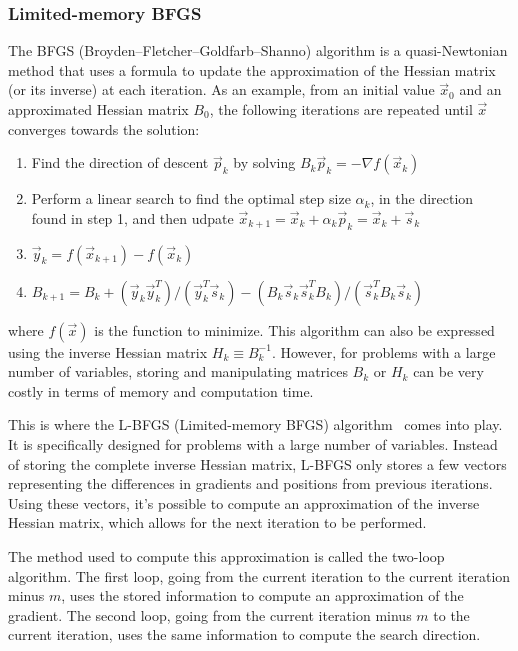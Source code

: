 \subsubsection{Limited-memory BFGS}
The BFGS (Broyden–Fletcher–Goldfarb–Shanno) algorithm is a quasi-Newtonian method that uses a formula to update the approximation of the  Hessian matrix (or its inverse) at each iteration. As an example, from an initial value $\Vec{x}_0$ and an approximated Hessian matrix $B_0$, the following iterations are repeated until $\Vec{x}$ converges towards the solution:
\begin{enumerate}
    \item Find the direction of descent $\Vec{p}_k$ by solving $B_k\Vec{p}_k = - \nabla f(\Vec{x}_k)$
    \item Perform a linear search to find the optimal step size $\alpha_k$, in the direction found in step 1, and then udpate
        $\Vec{x}_{k+1} = \Vec{x}_k + \alpha_k \Vec{p}_k = \Vec{x}_k + \Vec{s}_k$
    \item $\Vec{y}_k = f(\Vec{x}_{k+1}) - f(\Vec{x}_k)$
    \item $B_{k+1} = B_k + \left(\Vec{y}_k \Vec{y}_k^T\right)/\left(\Vec{y}_k^T \Vec{s}_k \right) - \left( B_k \Vec{s}_k\Vec{s}_k^TB_k\right)/\left(\Vec{s}_k^T B_k \Vec{s}_k\right)$
\end{enumerate} where $f(\Vec{x})$ is the function to minimize. This algorithm can also be expressed using the inverse Hessian matrix $H_k \equiv B_k^{-1}$. However, for problems with a large number of variables, storing and manipulating matrices $B_k$ or $H_k$ can be very costly in terms of memory and computation time.

This is where the L-BFGS (Limited-memory BFGS) algorithm~\cite{nocedal1980updating} comes into play. It is specifically designed for problems with a large number of variables. Instead of storing the complete inverse Hessian matrix, L-BFGS only stores a few vectors representing the differences in gradients and positions from previous iterations. Using these vectors, it's possible to compute an approximation of the inverse Hessian matrix, which allows for the next iteration to be performed.

The method used to compute this approximation is called the two-loop algorithm. The first loop, going from the current iteration to the current iteration minus $m$, uses the stored information to compute an approximation of the gradient. The second loop, going from the current iteration minus $m$ to the current iteration, uses the same information to compute the search direction.

